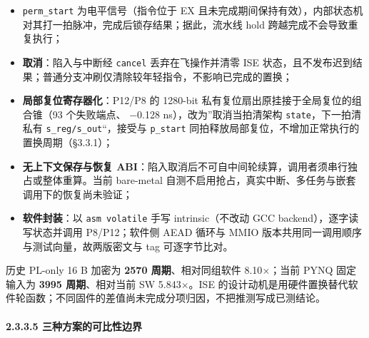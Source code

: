 \begin{itemize}
\tightlist
\item
  \texttt{perm\_\allowbreak{}start} 为电平信号（指令位于 EX 且未完成期间保持有效），内部状态机对其打一拍脉冲，完成后锁存结果；据此，流水线 hold 跨越完成不会导致重复执行；
\item
  \textbf{取消}：陷入与中断经 \texttt{cancel} 丢弃在飞操作并清零 ISE 状态，且不发布迟到结果；普通分支冲刷仅清除较年轻指令，不影响已完成的置换；
\item
  \textbf{局部复位寄存器化}：P12/P8 的 1280-bit 私有复位扇出原挂接于全局复位的组合锥（93 个失败端点、 $-$0.128 ns），改为''取消当拍清架构 \texttt{state}，下一拍清私有 \texttt{s\_\allowbreak{}reg/\allowbreak{}s\_\allowbreak{}out}``，接受与 \texttt{p\_\allowbreak{}start} 同拍释放局部复位，不增加正常执行的置换周期（§3.3.1）；
\item
  \textbf{无上下文保存与恢复 ABI}：陷入取消后不可自中间轮续算，调用者须串行独占或整体重算。当前 bare-metal 自测不启用抢占，真实中断、多任务与嵌套调用下的恢复尚未验证；
\item
  \textbf{软件封装}：以 \texttt{asm\ volatile} 手写 intrinsic（不改动 GCC backend），逐字读写状态并调用 P8/P12；软件侧 AEAD 循环与 MMIO 版本共用同一调用顺序与测试向量，故两版密文与 tag 可逐字节比对。
\end{itemize}

历史 PL-only 16 B 加密为 \textbf{2570 周期}、相对同组软件 8.10$\times$；当前 PYNQ 固定输入为 \textbf{3995 周期}、相对当前 SW 5.843$\times$。ISE 的设计动机是用硬件置换替代软件轮函数；不同固件的差值尚未完成分项归因，不把推测写成已测结论。


\Needspace{85pt}

\paragraph{2.3.3.5 三种方案的可比性边界}

